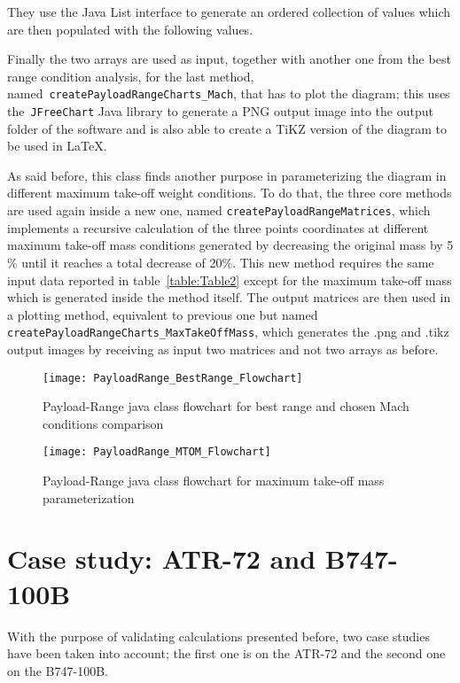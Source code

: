 \noindent
They use the Java \gls{List} interface to generate an ordered collection of values which are then populated with the following values.

\bigskip
\noindent
Finally the two arrays are used as input, together with another one from the best range condition analysis, for the last method, named~\lstinline[language=Java]!createPayloadRangeCharts_Mach!, that has to plot the diagram; this uses the~\lstinline[language=Java]!JFreeChart! Java library\cite{jfreechart} to generate a \gls{PNG} output image into the output folder of the software and is also able to create a \gls{TiKZ} version of the diagram to be used in \LaTeX.

As said before, this class finds another purpose in parameterizing the diagram in different maximum take-off weight conditions. To do that, the three core methods are used again inside a new one, named \lstinline[language=Java]!createPayloadRangeMatrices!, which implements a recursive calculation of the three points coordinates at different maximum take-off mass conditions generated by decreasing the original mass by 5$\%$ until it reaches a total decrease of 20$\%$. This new method requires the same input data reported in table~\ref{table:Table2} except for the maximum take-off mass which is generated inside the method itself. The output matrices are then used in a plotting method, equivalent to previous one but named \lstinline[language=Java]!createPayloadRangeCharts_MaxTakeOffMass!, which generates the .png and .tikz output images by receiving as input two matrices and not two arrays as before.

\bigskip
\begin{figure}[!ht]
\centering
\texttt{[image: PayloadRange\_BestRange\_Flowchart]}
\caption{Payload-Range java class flowchart for best range and chosen Mach conditions comparison}
\label{fig:Figure3}
\end{figure}

\bigskip
\begin{figure}[!ht]
\centering
\texttt{[image: PayloadRange\_MTOM\_Flowchart]}
\caption{Payload-Range java class flowchart for maximum take-off mass parameterization}
\label{fig:Figure4}
\end{figure}


\section{Case study: ATR-72 and B747-100B}
With the purpose of validating calculations presented before, two case studies have been taken into account; the first one is on the ATR-72 and the second one on the B747-100B.

